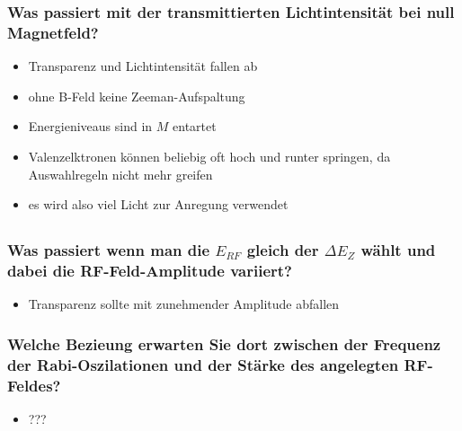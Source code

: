 \subsubsection[]{Was passiert mit der transmittierten Lichtintensität bei null Magnetfeld?}
\begin{itemize}
    \item Transparenz und Lichtintensität fallen ab 
    \item ohne B-Feld keine Zeeman-Aufspaltung
    \item Energieniveaus sind in $M$ entartet
    \item Valenzelktronen können beliebig oft hoch und runter springen, da Auswahlregeln nicht mehr greifen
    \item es wird also viel Licht zur Anregung verwendet
\end{itemize}

\subsection{}
\subsubsection[]{Was passiert wenn man die $E_{RF}$ gleich der $\Delta E_Z$ wählt und dabei die RF-Feld-Amplitude variiert?}
\begin{itemize}
    \item Transparenz sollte mit zunehmender Amplitude abfallen
\end{itemize}
\subsubsection[]{Welche Bezieung erwarten Sie dort zwischen der Frequenz der Rabi-Oszilationen und der Stärke des angelegten RF-Feldes?}
\begin{itemize}
    \item ???
\end{itemize}
